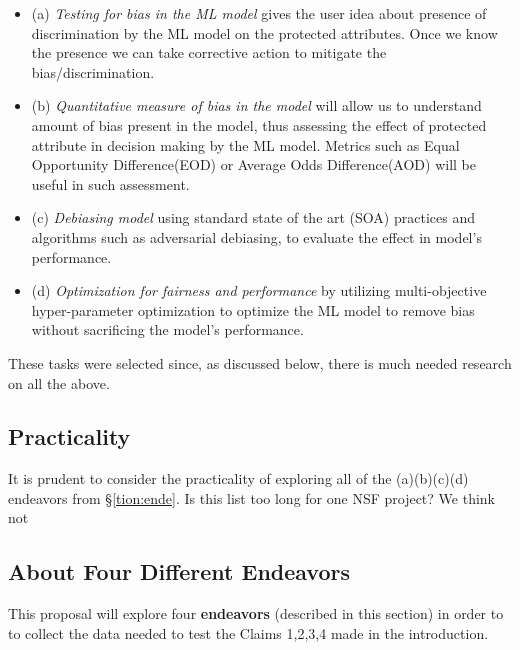 \documentclass{NSF}
\newenvironment{myitemize}
{ \begin{itemize}
    \setlength{\itemsep}{0pt}
    \setlength{\parskip}{0pt}
    \setlength{\parsep}{0pt}     }
{ \end{itemize}                  }
\newcommand{\bi}{\begin{myitemize}}
\newcommand{\ei}{\end{myitemize}}
\newcommand{\tion}[1]{\S\ref{tion:#1}}
\begin{document}
\begin{nsfdescription}
\bi
\item[(a)] {\em Testing for bias in the ML model}
gives the user idea about presence of discrimination by the ML model on the protected attributes. Once we know the presence we can take corrective action to mitigate the bias/discrimination.
\item[(b)]  {\em Quantitative measure of bias in the model } will allow us to understand amount of bias present in the model, thus assessing the effect of protected attribute in decision making by the ML model. Metrics such as Equal   Opportunity   Difference(EOD) or Average Odds Difference(AOD) will be useful in such assessment.
\item [(c)] {\em Debiasing model }
using standard state of the art (SOA) practices and algorithms such as adversarial debiasing, to evaluate the effect in model's performance.
\item[(d)] {\em Optimization for fairness and performance} by utilizing multi-objective hyper-parameter optimization to optimize the ML model to remove bias without sacrificing the model's performance. 
\ei
These tasks were selected since, as discussed below, there is much needed research on all the above.
 
 \subsection{Practicality}\label{tion:practical}

It is prudent to consider the practicality of exploring
all of the (a)(b)(c)(d) endeavors from \tion{ende}. Is this list too long for
one NSF project? We think not 



\subsection{About Four Different Endeavors}\label{tion:four}
This proposal will explore  four
{\bf endeavors} (described in this section)
in order to 
to collect the data needed to test the  Claims 1,2,3,4 made in the introduction. 



\end{nsfdescription}
\end{document}
